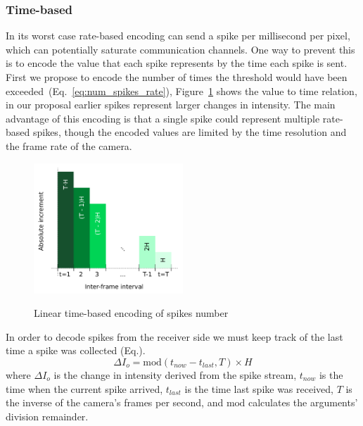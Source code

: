 \documentclass[twocolumn]{article}
\begin{document}
  \subsubsection{Time-based}
  In its worst case rate-based encoding can send a spike per millisecond per pixel, which can potentially saturate communication channels. One way to prevent this is to encode the value that each spike represents by the time each spike is sent. First we propose to encode the number of times the threshold would have been exceeded~(Eq.~\ref{eq:num_spikes_rate}), Figure~\ref{fig:linear_time} shows the value to time relation, in our proposal earlier spikes represent larger changes in intensity. The main advantage of this encoding is that a single spike could represent multiple rate-based spikes, though the encoded values are limited by the time resolution and the frame rate of the camera.
  
  \begin{figure}[htb]
    \includegraphics[width=0.5\textwidth]{spike_stream_time}
    \label{fig:linear_time}
    \caption{Linear time-based encoding of spikes number}
  \end{figure} 
  
  In order to decode spikes from the receiver side we must keep track of the last time a spike was collected (Eq.). 
  \begin{equation}
    \label{eq:decode_time}
    \Delta I_o = \mathrm{mod}\left(t_{now} - t_{last}, T\right)\times H
  \end{equation}
  where $\Delta I_o$ is the change in intensity derived from the spike stream, $t_{now}$ is the time when the current spike arrived, $t_{last}$ is the time last spike was received, $T$ is the inverse of the camera's frames per second, and $\mathrm{mod}$ calculates the arguments' division remainder.
  
\end{document}
